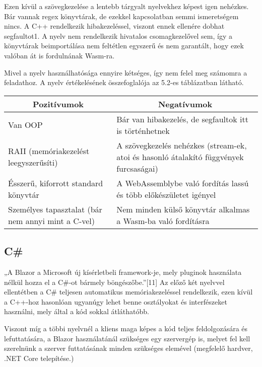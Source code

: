 Ezen kívül a szövegkezelése a lentebb tárgyalt nyelvekhez képest igen nehézkes. Bár vannak regex könyvtárak, de ezekkel kapcsolatban semmi ismeretségem nincs. A C++ rendelkezik hibakezeléssel, viszont ennek ellenére dobhat segfaultot1. A nyelv nem rendelkezik hivatalos csomagkezelővel sem, így a könyvtárak beimportálása nem feltétlen egyszerű és nem garantált, hogy ezek valóban át is fordulnának Wasm-ra.

Mivel a nyelv használhatósága ennyire kétséges, így nem felel meg számomra a feladathoz. A nyelv értékelésének összefoglalója az 5.2-es táblázatban látható.

\begin{center}
  \begin{tabularx}{\textwidth}{X X}
    \hline
    \multicolumn{1}{c}{\bfseries{Pozitívumok}} & \multicolumn{1}{c}{\bfseries{Negatívumok}} \\
    \hline
    Van OOP & Bár van hibakezelés, de segfaultok itt is történhetnek \\
    RAII (memóriakezelést leegyszerűsíti) & A szövegkezelés nehézkes (stream-ek, atoi és hasonló átalakító függvények furcsaságai) \\
    Ésszerű, kiforrott standard könyvtár & A WebAssemblybe való fordítás lassú és több előkészületet igényel \\
    Személyes tapasztalat (bár nem annyi mint a C-vel) & Nem minden külső könyvtár alkalmas a Wasm-ba való fordításra \\
    \hline
  \end{tabularx}
\end{center}

\newpage

\subsection{C\#}

„A Blazor a Microsoft új kísérletbeli framework-je, mely pluginok használata nélkül hozza el a C\#-ot bármely böngészőbe.”[11] Az előző két nyelvvel ellentétben a C\# teljesen automatikus memóriakezeléssel rendelkezik, ezen kívül a C++-hoz hasonlóan ugyanúgy lehet benne osztályokat és interfészeket használni, mely által a kód sokkal átláthatóbb.

Viszont míg a többi nyelvnél a kliens maga képes a kód teljes feldolgozására és lefuttatására, a Blazor használatánál szükséges egy szervergép is, melyet fel kell szerelnünk a szerver futtatásának minden szükséges elemével (megfelelő hardver, .NET Core telepítése.)

